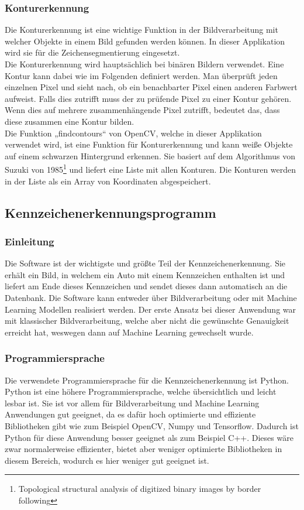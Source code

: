 \subsubsection{Konturerkennung}
Die Konturerkennung ist eine wichtige Funktion in der Bildverarbeitung mit welcher Objekte in einem Bild gefunden werden können. 
In dieser Applikation wird sie für die Zeichensegmentierung eingesetzt.\\

Die Konturerkennung wird hauptsächlich bei binären Bildern verwendet. Eine Kontur kann dabei wie im Folgenden definiert werden. 
Man überprüft jeden einzelnen Pixel und sieht nach, ob ein benachbarter Pixel einen anderen Farbwert aufweist. Falls dies 
zutrifft muss der zu prüfende Pixel zu einer Kontur gehören. Wenn dies auf mehrere zusammenhängende Pixel zutrifft, bedeutet 
das, dass diese zusammen eine Kontur bilden.\\

Die Funktion „findcontours“ von OpenCV, welche in dieser Applikation verwendet wird, ist eine Funktion für Konturerkennung 
und kann weiße Objekte auf einem schwarzen Hintergrund erkennen. Sie basiert auf dem Algorithmus von Suzuki von 
1985\footnote{Topological structural analysis of digitized binary images by border following} und 
liefert eine Liste mit allen Konturen. Die Konturen werden in der Liste als ein Array von Koordinaten abgespeichert.

\subsection{Kennzeichenerkennungsprogramm}

\subsubsection{Einleitung}
Die Software ist der wichtigste und größte Teil der Kennzeichenerkennung. Sie erhält ein Bild, in welchem ein Auto mit 
einem Kennzeichen enthalten ist und liefert am Ende dieses Kennzeichen und sendet dieses dann automatisch an die Datenbank. 
Die Software kann entweder über Bildverarbeitung oder mit Machine Learning Modellen realisiert werden. Der erste Ansatz bei 
dieser Anwendung war mit klassischer Bildverarbeitung, welche aber nicht die gewünschte Genauigkeit erreicht hat, weswegen 
dann auf Machine Learning gewechselt wurde.

\subsubsection{Programmiersprache}
Die verwendete Programmiersprache für die Kennzeichenerkennung ist Python. Python ist eine höhere Programmiersprache, 
welche übersichtlich und leicht lesbar ist. Sie ist vor allem für Bildverarbeitung und Machine Learning Anwendungen gut geeignet, 
da es dafür hoch optimierte und effiziente Bibliotheken gibt wie zum Beispiel OpenCV, Numpy und Tensorflow. Dadurch ist Python 
für diese Anwendung besser geeignet als zum Beispiel C++. Dieses wäre zwar normalerweise effizienter, bietet aber weniger 
optimierte Bibliotheken in diesem Bereich, wodurch es hier weniger gut geeignet ist.

